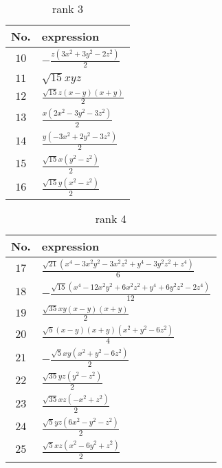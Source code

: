 \documentclass[fleqn,8pt,landscape]{jsarticle}
\begin{document}
\begin{table}[ht!]
\begin{center}
\caption{rank 3}
\renewcommand{\arraystretch}{1.3}
\begin{tabular}{cl} \hline \hline
No. & expression \\ \hline
$ 10 $ & $ - \frac{z \left(3 x^{2} + 3 y^{2} - 2 z^{2}\right)}{2} $ \\
$ 11 $ & $ \sqrt{15} x y z $ \\
$ 12 $ & $ \frac{\sqrt{15} z \left(x - y\right) \left(x + y\right)}{2} $ \\
$ 13 $ & $ \frac{x \left(2 x^{2} - 3 y^{2} - 3 z^{2}\right)}{2} $ \\
$ 14 $ & $ \frac{y \left(- 3 x^{2} + 2 y^{2} - 3 z^{2}\right)}{2} $ \\
$ 15 $ & $ \frac{\sqrt{15} x \left(y^{2} - z^{2}\right)}{2} $ \\
$ 16 $ & $ \frac{\sqrt{15} y \left(x^{2} - z^{2}\right)}{2} $ \\
 \hline \hline
\end{tabular}
\end{center}
\end{table}
\begin{table}[ht!]
\begin{center}
\caption{rank 4}
\renewcommand{\arraystretch}{1.3}
\begin{tabular}{cl} \hline \hline
No. & expression \\ \hline
$ 17 $ & $ \frac{\sqrt{21} \left(x^{4} - 3 x^{2} y^{2} - 3 x^{2} z^{2} + y^{4} - 3 y^{2} z^{2} + z^{4}\right)}{6} $ \\
$ 18 $ & $ - \frac{\sqrt{15} \left(x^{4} - 12 x^{2} y^{2} + 6 x^{2} z^{2} + y^{4} + 6 y^{2} z^{2} - 2 z^{4}\right)}{12} $ \\
$ 19 $ & $ \frac{\sqrt{35} x y \left(x - y\right) \left(x + y\right)}{2} $ \\
$ 20 $ & $ \frac{\sqrt{5} \left(x - y\right) \left(x + y\right) \left(x^{2} + y^{2} - 6 z^{2}\right)}{4} $ \\
$ 21 $ & $ - \frac{\sqrt{5} x y \left(x^{2} + y^{2} - 6 z^{2}\right)}{2} $ \\
$ 22 $ & $ \frac{\sqrt{35} y z \left(y^{2} - z^{2}\right)}{2} $ \\
$ 23 $ & $ \frac{\sqrt{35} x z \left(- x^{2} + z^{2}\right)}{2} $ \\
$ 24 $ & $ \frac{\sqrt{5} y z \left(6 x^{2} - y^{2} - z^{2}\right)}{2} $ \\
$ 25 $ & $ \frac{\sqrt{5} x z \left(x^{2} - 6 y^{2} + z^{2}\right)}{2} $ \\
 \hline \hline
\end{tabular}
\end{center}
\end{table}
\end{document}
